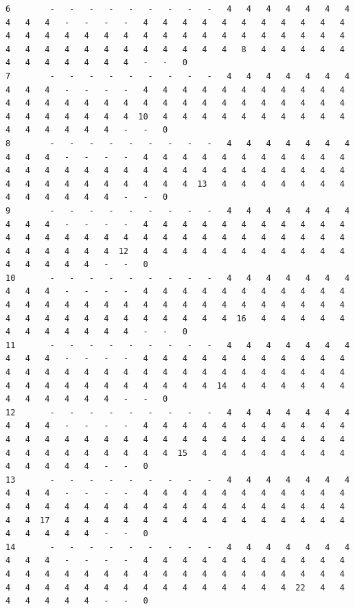 \documentclass[11pt,a4paper]{article}
\begin{document}
\begin{landscape}
\begin{verbatim}
6        -   -   -   -   -   -   -   -   -   4   4   4   4   4   4   4   4   4   4   -   -   -   -   4   4   4   4   4   4   4   4   4   4   4   4   4   4   4   4   4   4   4   4   4   4   4   4   4   4   4   4   4   4   4   4   4   4   4   4   4   4   4   4   4   8   4   4   4   4   4   4   4   4   4   4   4   4   -   -   0
7        -   -   -   -   -   -   -   -   -   4   4   4   4   4   4   4   4   4   4   -   -   -   -   4   4   4   4   4   4   4   4   4   4   4   4   4   4   4   4   4   4   4   4   4   4   4   4   4   4   4   4   4   4   4   4   4   4   4   4  10   4   4   4   4   4   4   4   4   4   4   4   4   4   4   4   4   -   -   0
8        -   -   -   -   -   -   -   -   -   4   4   4   4   4   4   4   4   4   4   -   -   -   -   4   4   4   4   4   4   4   4   4   4   4   4   4   4   4   4   4   4   4   4   4   4   4   4   4   4   4   4   4   4   4   4   4   4   4   4   4   4   4  13   4   4   4   4   4   4   4   4   4   4   4   4   4   -   -   0
9        -   -   -   -   -   -   -   -   -   4   4   4   4   4   4   4   4   4   4   -   -   -   -   4   4   4   4   4   4   4   4   4   4   4   4   4   4   4   4   4   4   4   4   4   4   4   4   4   4   4   4   4   4   4   4   4   4   4  12   4   4   4   4   4   4   4   4   4   4   4   4   4   4   4   4   -   -   0
10       -   -   -   -   -   -   -   -   -   4   4   4   4   4   4   4   4   4   4   -   -   -   -   4   4   4   4   4   4   4   4   4   4   4   4   4   4   4   4   4   4   4   4   4   4   4   4   4   4   4   4   4   4   4   4   4   4   4   4   4   4   4   4   4  16   4   4   4   4   4   4   4   4   4   4   4   4   -   -   0
11       -   -   -   -   -   -   -   -   -   4   4   4   4   4   4   4   4   4   4   -   -   -   -   4   4   4   4   4   4   4   4   4   4   4   4   4   4   4   4   4   4   4   4   4   4   4   4   4   4   4   4   4   4   4   4   4   4   4   4   4   4   4   4  14   4   4   4   4   4   4   4   4   4   4   4   4   -   -   0
12       -   -   -   -   -   -   -   -   -   4   4   4   4   4   4   4   4   4   4   -   -   -   -   4   4   4   4   4   4   4   4   4   4   4   4   4   4   4   4   4   4   4   4   4   4   4   4   4   4   4   4   4   4   4   4   4   4   4   4   4   4  15   4   4   4   4   4   4   4   4   4   4   4   4   4   -   -   0
13       -   -   -   -   -   -   -   -   -   4   4   4   4   4   4   4   4   4   4   -   -   -   -   4   4   4   4   4   4   4   4   4   4   4   4   4   4   4   4   4   4   4   4   4   4   4   4   4   4   4   4   4   4   4  17   4   4   4   4   4   4   4   4   4   4   4   4   4   4   4   4   4   4   4   4   -   -   0
14       -   -   -   -   -   -   -   -   -   4   4   4   4   4   4   4   4   4   4   -   -   -   -   4   4   4   4   4   4   4   4   4   4   4   4   4   4   4   4   4   4   4   4   4   4   4   4   4   4   4   4   4   4   4   4   4   4   4   4   4   4   4   4   4   4   4   4  22   4   4   4   4   4   4   4   -   -   0

\end{verbatim}
\end{landscape}
\end{document}
